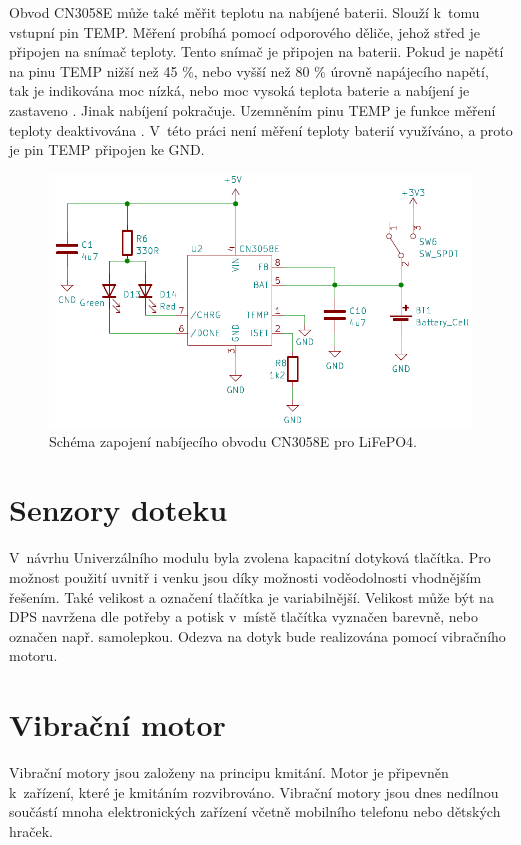 Obvod CN3058E může také měřit teplotu na nabíjené baterii. Slouží k~tomu vstupní pin TEMP. Měření probíhá pomocí odporového děliče, jehož střed je připojen na snímač 
teploty. Tento snímač je připojen na baterii. Pokud je napětí na pinu TEMP nižší než 45 \%, nebo vyšší než 80 \% úrovně napájecího napětí, tak je indikována moc nízká,
nebo moc vysoká teplota baterie a nabíjení je zastaveno \cite{charger_dtsh}. Jinak nabíjení pokračuje. Uzemněním pinu TEMP je funkce měření teploty deaktivována 
\cite{charger_dtsh}. V~této práci není měření teploty baterií využíváno, a proto je pin TEMP připojen ke GND. 

\begin{figure}[!h]
  \begin{center}
    \includegraphics[scale=0.55]{obrazky/CN3058E.png}
  \end{center}
  \caption[Schéma zapojení nabíjecího obvodu CN3058E pro LiFePO4]{Schéma zapojení nabíjecího obvodu CN3058E pro LiFePO4.}
\end{figure}

\section{Senzory doteku}
V~návrhu Univerzálního modulu byla zvolena kapacitní dotyková tlačítka. Pro možnost použití uvnitř i venku jsou díky možnosti voděodolnosti 
vhodnějším řešením. Také velikost a označení tlačítka je variabilnější. Velikost může být na DPS navržena dle potřeby a potisk
v~místě tlačítka vyznačen barevně, nebo označen např. samolepkou. Odezva na dotyk bude realizována pomocí vibračního motoru.

\section{Vibrační motor}
Vibrační motory jsou založeny na principu kmitání. Motor je připevněn k~zařízení, které je kmitáním rozvibrováno. Vibrační motory jsou dnes 
nedílnou součástí mnoha elektronických zařízení včetně mobilního telefonu nebo dětských hraček. 

